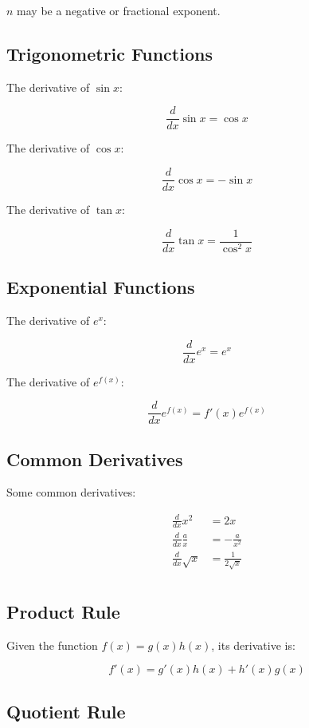 \documentclass[a4paper,11pt]{article}
\begin{document}
$n$ may be a negative or fractional exponent.


\subsection{Trigonometric Functions}

The derivative of $\sin{x}$:

$$
\frac{d}{dx} \sin{x} = \cos{x}
$$

The derivative of $\cos{x}$:

$$
\frac{d}{dx} \cos{x} = -\sin{x}
$$

The derivative of $\tan{x}$:

$$
\frac{d}{dx} \tan{x} = \frac{1}{\cos^2{x}}
$$



\subsection{Exponential Functions}

The derivative of $e^x$:

$$
\frac{d}{dx} e^x = e^x
$$

The derivative of $e^{f(x)}$:

$$
\frac{d}{dx} e^{f(x)} = f'(x)e^{f(x)}
$$


\subsection{Common Derivatives}

Some common derivatives:

$$
\begin{aligned}
\frac{d}{dx} x^2 & = 2x \\
\frac{d}{dx} \frac{a}{x} & = -\frac{a}{x^2} \\
\frac{d}{dx} \sqrt{x} & = \frac{1}{2\sqrt{x}} \\
\end{aligned}
$$


\subsection{Product Rule}

Given the function $f(x) = g(x) h(x)$, its derivative is:

$$
f'(x) = g'(x) h(x) + h'(x) g(x)
$$


\subsection{Quotient Rule}
\end{document}
